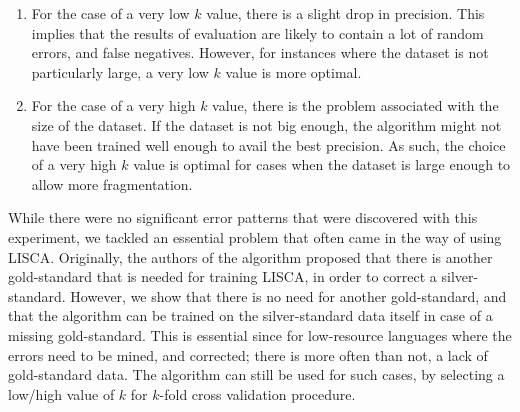 \begin{enumerate}
    \item For the case of a very low \(k\) value, there is a slight drop in precision. This implies that the results of evaluation are likely to contain a lot of random errors, and false negatives. However, for instances where the dataset is not particularly large, a very low \(k\) value is more optimal.
    \item For the case of a very high \(k\) value, there is the problem associated with the size of the dataset. If the dataset is not big enough, the algorithm might not have been trained well enough to avail the best precision. As such, the choice of a very high \(k\) value is optimal for cases when the dataset is large enough to allow more fragmentation.
\end{enumerate}

While there were no significant error patterns that were discovered with this experiment, we tackled an essential problem that often came in the way of using LISCA. Originally, the authors of the algorithm proposed that there is another gold-standard that is needed for training LISCA, in order to correct a silver-standard. However, we show that there is no need for another gold-standard, and that the algorithm can be trained on the silver-standard data itself in case of a missing gold-standard. This is essential since for low-resource languages where the errors need to be mined, and corrected; there is more often than not, a lack of gold-standard data. The algorithm can still be used for such cases, by selecting a low/high value of \(k\) for \(k\)-fold cross validation procedure.